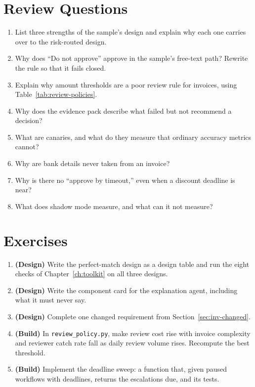 \section*{Review Questions}

\begin{enumerate}[itemsep=2pt]
  \item List three strengths of the sample's design and explain why each one carries over to the risk-routed design.
  \item Why does ``Do not approve'' approve in the sample's free-text path? Rewrite the rule so that it fails closed.
  \item Explain why amount thresholds are a poor review rule for invoices, using Table~\ref{tab:review-policies}.
  \item Why does the evidence pack describe what failed but not recommend a decision?
  \item What are canaries, and what do they measure that ordinary accuracy metrics cannot?
  \item Why are bank details never taken from an invoice?
  \item Why is there no ``approve by timeout,'' even when a discount deadline is near?
  \item What does shadow mode measure, and what can it not measure?
\end{enumerate}

\section*{Exercises}

\begin{enumerate}[itemsep=2pt]
  \item \textbf{(Design)} Write the perfect-match design as a design table and run the eight checks of Chapter~\ref{ch:toolkit} on all three designs.
  \item \textbf{(Design)} Write the component card for the explanation agent, including what it must never say.
  \item \textbf{(Design)} Complete one changed requirement from Section~\ref{sec:inv-changed}.
  \item \textbf{(Build)} In \texttt{review\_policy.py}, make review cost rise with invoice complexity and reviewer catch rate fall as daily review volume rises. Recompute the best threshold.
  \item \textbf{(Build)} Implement the deadline sweep: a function that, given paused workflows with deadlines, returns the escalations due, and its tests.
\end{enumerate}

